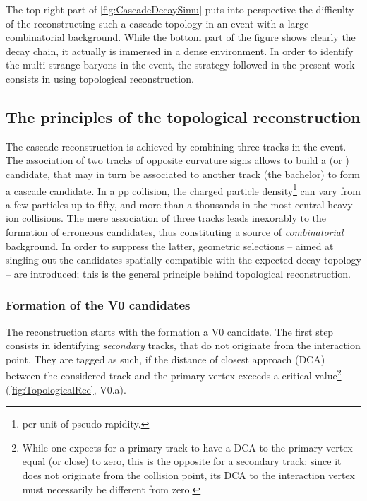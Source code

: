 The top right part of \fig\ref{fig:CascadeDecaySimu} puts into perspective the difficulty of the reconstructing such a cascade topology in an event with a large combinatorial background. While the bottom part of the figure shows clearly the \rmXiM decay chain, it actually is immersed in a dense environment. In order to identify the multi-strange baryons in the event, the strategy followed in the present work consists in using topological reconstruction.

\subsection{The principles of the topological reconstruction}
\label{subsec:TopoReco}

The cascade reconstruction is achieved by combining three tracks in the event. The association of two tracks of opposite curvature signs allows to build a \rmLambda (or \rmAlambda) candidate, that may in turn be associated to another track (the bachelor) to form a cascade candidate. In a pp collision, the charged particle density\footnote{per unit of pseudo-rapidity.} can vary from a few particles up to fifty, and more than a thousands in the most central heavy-ion collisions. The mere association of three tracks leads inexorably to the formation of erroneous candidates, thus constituting a source of \textit{combinatorial} background. In order to suppress the latter, geometric selections -- aimed at singling out the candidates spatially compatible with the expected decay topology -- are introduced; this is the general principle behind topological reconstruction.

\subsubsection{Formation of the V0 candidates}
\label{subsubsec:V0Formation}

The reconstruction starts with the formation a V0 candidate. The first step consists in identifying \textit{secondary} tracks, that do not originate from the interaction point. They are tagged as such, if the distance of closest approach (DCA) between the considered track and the primary vertex exceeds a critical value\footnote{While one expects for a primary track to have a DCA to the primary vertex equal (or close) to zero, this is the opposite for a secondary track: since it does not originate from the collision point, its DCA to the interaction vertex must necessarily be different from zero.} (\fig\ref{fig:TopologicalRec}, V0.a). 

